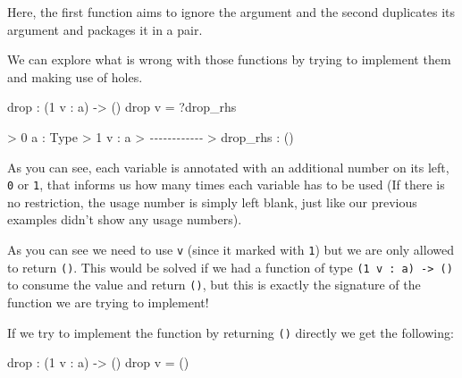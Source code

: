 \documentclass[
]{article}
\newenvironment{Shaded}{}{}
\newcommand{\CommentTok}[1]{\textcolor[rgb]{0.38,0.63,0.69}{\textit{#1}}}
\newcommand{\DataTypeTok}[1]{\textcolor[rgb]{0.56,0.13,0.00}{#1}}
\newcommand{\DecValTok}[1]{\textcolor[rgb]{0.25,0.63,0.44}{#1}}
\newcommand{\FunctionTok}[1]{\textcolor[rgb]{0.02,0.16,0.49}{#1}}
\newcommand{\NormalTok}[1]{#1}
\newcommand{\OperatorTok}[1]{\textcolor[rgb]{0.40,0.40,0.40}{#1}}
\newcommand{\OtherTok}[1]{\textcolor[rgb]{0.00,0.44,0.13}{#1}}
\begin{document}
Here, the first function aims to ignore the argument and the second
duplicates its argument and packages it in a pair.

We can explore what is wrong with those functions by trying to implement
them and making use of holes.

\begin{Shaded}
\begin{Highlighting}[]
\FunctionTok{drop} \OperatorTok{:}\NormalTok{ (}\DecValTok{1}\NormalTok{ v }\OperatorTok{:}\NormalTok{ a) }\OtherTok{{-}\textgreater{}}\NormalTok{ ()}
\FunctionTok{drop}\NormalTok{ v }\OtherTok{=} \OperatorTok{?}\NormalTok{drop\_rhs}
\end{Highlighting}
\end{Shaded}

\begin{Shaded}
\begin{Highlighting}[]
\OperatorTok{\textgreater{}} \DecValTok{0}\NormalTok{ a }\OperatorTok{:} \DataTypeTok{Type}
\OperatorTok{\textgreater{}} \DecValTok{1}\NormalTok{ v }\OperatorTok{:}\NormalTok{ a}
\OperatorTok{\textgreater{}} \CommentTok{{-}{-}{-}{-}{-}{-}{-}{-}{-}{-}{-}{-}}
\OperatorTok{\textgreater{}}\NormalTok{ drop\_rhs }\OperatorTok{:}\NormalTok{ ()}
\end{Highlighting}
\end{Shaded}

As you can see, each variable is annotated with an additional number on
its left, \texttt{0} or \texttt{1}, that informs us how many times each
variable has to be used (If there is no restriction, the usage number is
simply left blank, just like our previous examples didn't show any usage
numbers).

As you can see we need to use \texttt{v} (since it marked with
\texttt{1}) but we are only allowed to return \texttt{()}. This would be
solved if we had a function of type
\texttt{(1\ v\ :\ a)\ -\textgreater{}\ ()} to consume the value and
return \texttt{()}, but this is exactly the signature of the function we
are trying to implement!

If we try to implement the function by returning \texttt{()} directly we
get the following:

\begin{Shaded}
\begin{Highlighting}[]
\FunctionTok{drop} \OperatorTok{:}\NormalTok{ (}\DecValTok{1}\NormalTok{ v }\OperatorTok{:}\NormalTok{ a) }\OtherTok{{-}\textgreater{}}\NormalTok{ ()}
\FunctionTok{drop}\NormalTok{ v }\OtherTok{=}\NormalTok{ ()}
\end{Highlighting}
\end{Shaded}
\end{document}

